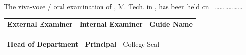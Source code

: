 \vspace{2\baselineskip}

{The viva-voce / oral examination of {\textbf{{\myname}}}, M. Tech. in \branch,
has been held on \ ………………}

\vspace{5\baselineskip}

\begin{tabular}{p{}p{}p{}}
\textbf{External Examiner} & \textbf{Internal Examiner} & \textbf{Guide Name}
\end{tabular}

\vspace{4\baselineskip}

\begin{tabular}{p{}p{}p{}}
\textbf{Head of Department} & \textbf{Principal} & College Seal
\end{tabular}


\bigskip